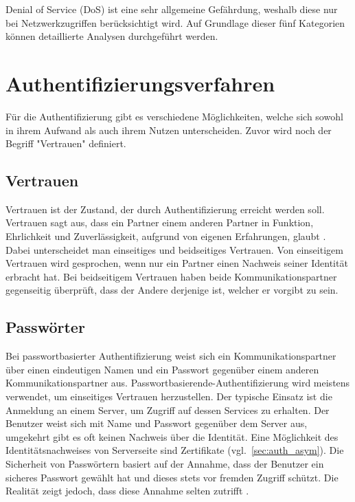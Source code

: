 \documentclass[11pt,a4paper]{report}
\begin{document}
Denial of Service (DoS) ist eine sehr allgemeine Gefährdung, weshalb diese nur bei Netzwerkzugriffen berücksichtigt wird. Auf Grundlage dieser fünf Kategorien können detaillierte Analysen durchgeführt werden.

\section{Authentifizierungsverfahren} \label{sec:auth_modells}

Für die Authentifizierung gibt es verschiedene Möglichkeiten, welche sich sowohl in ihrem Aufwand als auch ihrem Nutzen unterscheiden. Zuvor wird noch der Begriff "Vertrauen" definiert.

\subsection{Vertrauen}

Vertrauen ist der Zustand, der durch Authentifizierung erreicht werden soll. Vertrauen sagt aus, dass ein Partner einem anderen Partner in Funktion, Ehrlichkeit und Zuverlässigkeit, aufgrund von eigenen Erfahrungen, glaubt \cite{chen}. Dabei unterscheidet man einseitiges und beidseitiges Vertrauen. Von einseitigem Vertrauen wird gesprochen, wenn nur ein Partner einen Nachweis seiner Identität erbracht hat. Bei beidseitigem Vertrauen haben beide Kommunikationspartner gegenseitig überprüft, dass der Andere derjenige ist, welcher er vorgibt zu sein.

\subsection{Passwörter}

Bei passwortbasierter Authentifizierung weist sich ein Kommunikationspartner über einen eindeutigen Namen und ein Passwort gegenüber einem anderen Kommunikationspartner aus. Passwortbasierende-Authentifizierung wird meistens verwendet, um einseitiges Vertrauen herzustellen. Der typische Einsatz ist die Anmeldung an einem Server, um Zugriff auf dessen Services zu erhalten. Der Benutzer weist sich mit Name und Passwort gegenüber dem Server aus, umgekehrt gibt es oft keinen Nachweis über die Identität. Eine Möglichkeit des Identitätsnachweises von Serverseite sind Zertifikate (vgl.~\ref{sec:auth_asym}). Die Sicherheit von Passwörtern basiert auf der Annahme, dass der Benutzer ein sicheres Passwort gewählt hat und dieses stets vor fremden Zugriff schützt. Die Realität zeigt jedoch, dass diese Annahme selten zutrifft \cite[s.~2]{gutmann}.
\end{document}
